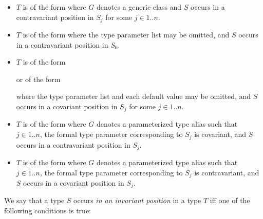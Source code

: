 \documentclass{article}
\begin{document}
\begin{itemize}
\item $T$ is of the form 
  where $G$ denotes a generic class
  and $S$ occurs in a contravariant position in $S_j$
  for some $j \in 1 .. n$.

\item $T$ is of the form
  where the type parameter list may be omitted,
  and $S$ occurs in a contravariant position in $S_0$.

\item $T$ is of the form



  \noindent
  or of the form



  \noindent
  where the type parameter list and each default value may be omitted,
  and $S$ occurs in a covariant position in $S_j$
  for some $j \in 1 .. n$.

\item $T$ is of the form 
  where $G$ denotes a parameterized type alias such that
  $j \in 1 .. n$,
  the formal type parameter corresponding to $S_j$ is covariant,
  and $S$ occurs in a contravariant position in $S_j$.

\item $T$ is of the form 
  where $G$ denotes a parameterized type alias such that
  $j \in 1 .. n$,
  the formal type parameter corresponding to $S_j$ is contravariant,
  and $S$ occurs in a covariant position in $S_j$.
\end{itemize}

\LMHash{}
We say that a type $S$ occurs {\em in an invariant position} in a type $T$
if{}f one of the following conditions is true:
\end{document}
